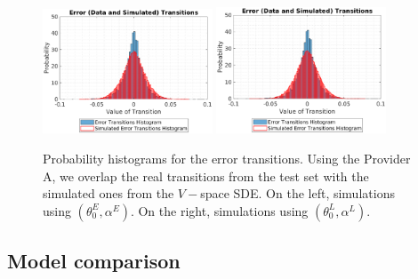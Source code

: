 \documentclass[11pt]{article}
\theoremstyle{definition}
\begin{document}
\begin{figure}[ht!]
\centering
\includegraphics[width=0.45\textwidth]{../../MATLAB_Files/Results/histograms/classic_noDelta/Optimal.eps}
\includegraphics[width=0.45\textwidth]{../../MATLAB_Files/Results/histograms/classic_noDelta/Lamperti_Optimal.eps}
\caption{Probability histograms for the error transitions. Using the Provider A, we overlap the real transitions from the test set with the simulated ones from the $V-$space SDE. On the left, simulations using $(\theta_0^E,\alpha^E)$. On the right, simulations using $(\theta_0^L,\alpha^L)$.}
\label{fig:hists}
\end{figure}

\subsection{Model comparison} \label{Model_Comp}
\end{document}
